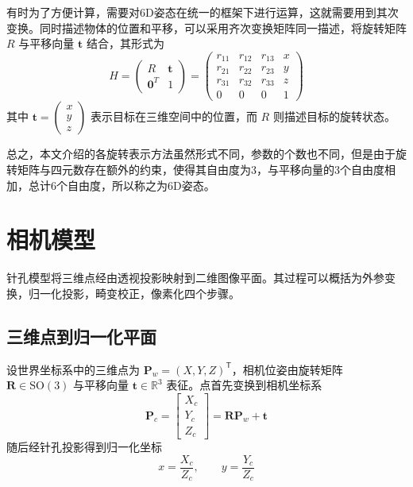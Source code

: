 有时为了方便计算，需要对6D姿态在统一的框架下进行运算，这就需要用到其次变换。同时描述物体的位置和平移，可以采用齐次变换矩阵同一描述，将旋转矩阵 $R$ 与平移向量 $\mathbf{t}$ 结合，其形式为
\begin{equation}
	H = \begin{pmatrix}
		R & \mathbf{t} \\
		\mathbf{0}^T & 1
	\end{pmatrix} =
	\begin{pmatrix}
		r_{11} & r_{12} & r_{13} & x \\
		r_{21} & r_{22} & r_{23} & y \\
		r_{31} & r_{32} & r_{33} & z \\
		0      & 0      & 0      & 1
	\end{pmatrix}
\end{equation}
其中 $\mathbf{t} = \begin{pmatrix} x \\ y \\ z \end{pmatrix}$ 表示目标在三维空间中的位置，而 $R$ 则描述目标的旋转状态。

总之，本文介绍的各旋转表示方法虽然形式不同，参数的个数也不同，但是由于旋转矩阵与四元数存在额外的约束，使得其自由度为3，与平移向量的3个自由度相加，总计6个自由度，所以称之为6D姿态。



\section{相机模型}
针孔模型将三维点经由透视投影映射到二维图像平面。其过程可以概括为外参变换，归一化投影，畸变校正，像素化四个步骤。

\subsection{三维点到归一化平面}
设世界坐标系中的三维点为
\(
\mathbf{P}_w=(X,Y,Z)^\mathsf{T}
\)，相机位姿由旋转矩阵 $\mathbf{R}\in\mathrm{SO}(3)$ 与平移向量 $\mathbf{t}\in\mathbb{R}^3$ 表征。点首先变换到相机坐标系
\begin{equation}
	\mathbf{P}_c
	=\begin{bmatrix}X_c\\Y_c\\Z_c\end{bmatrix}
	=\mathbf{R}\mathbf{P}_w+\mathbf{t}
\end{equation}
随后经针孔投影得到归一化坐标
\begin{equation}
	x=\frac{X_c}{Z_c},\qquad
	y=\frac{Y_c}{Z_c}
	\label{eq:normalized_xy}
\end{equation}

